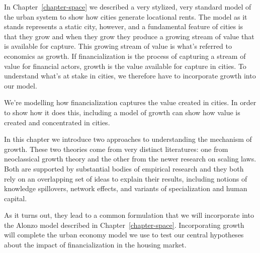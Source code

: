 In Chapter~\ref{chapter-space} we described a very stylized, very standard model of the urban system to show how cities generate locational rents.
The model as it stands represents a static city, however, and a fundamental feature of cities is that they grow and when they grow they produce a growing stream of value that is available for capture. %
%
This growing stream of value is what's referred to economics as growth. If financialization is the process of capturing a stream of value for financial actors, growth is the value available for capture in cities. To understand what's at stake in cities, we therefore have to incorporate growth into our model. {\color{red} %
We're modelling how financialization captures the value created in cities. In order to show how it does this, %
including a model of growth can show how value is created and concentrated in cities. %


In this chapter we introduce two approaches to understanding the mechanism of growth. These two theories come from very distinct literatures: one from neoclassical growth theory and the other from the newer research on scaling laws. Both are supported by  substantial bodies of empirical research and they both rely  on  an overlapping set of ideas to explain their results, including notions of knowledge spillovers, network effects, and variants of specialization and human capital. 

As it turns out, they lead to a common formulation that we will incorporate into the Alonzo model described in  Chapter~\ref{chapter-space}. 
Incorporating growth will complete the urban economy model we use to test our central hypotheses about the impact of financialization in the housing market.%

}
